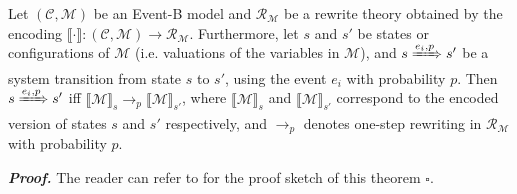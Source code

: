 \begin{theorem}[adequacy]
Let $(\mathscr{C}, \mathscr{M})$ be an Event-B model and
$\mathcal{R}_{\mathcal{M}}$ be a rewrite theory obtained by the encoding $\llbracket \cdot \rrbracket: (\mathscr{C}, \mathscr{M}) \rightarrow \mathscr{R}_\mathscr{M}$. Furthermore, let $s$ and $s'$ be states or configurations of $\mathscr{M}$ (i.e. valuations of the variables in $\mathscr{M}$), and $s \xRightarrow{e_i,p} s'$ be a system transition from state $s$ to $s'$, using the event $e_i$ with probability $p$. Then $s \xRightarrow{e_i,p} s'$ iff $\llbracket \mathscr{M} \rrbracket_s \rightarrow_p \llbracket \mathscr{M} \rrbracket_{s'}$, where $\llbracket \mathscr{M} \rrbracket_s$ and $\llbracket \mathscr{M} \rrbracket_{s'}$ correspond to the encoded version of states $s$ and $s'$ respectively, and $\rightarrow_p$ denotes one-step rewriting in $\mathscr{R}_\mathscr{M}$ with probability $p$.
\end{theorem}

\textbf{\textit{Proof.}} The reader can refer to \cite{Olarte} for the proof sketch of this theorem $\square$.